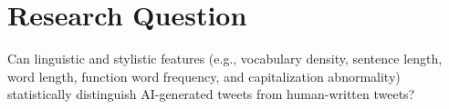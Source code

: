 \section*{Research Question}

Can linguistic and stylistic features (e.g., vocabulary density, sentence length, word length, function word frequency, and capitalization abnormality) 
statistically distinguish AI-generated tweets from human-written tweets?

